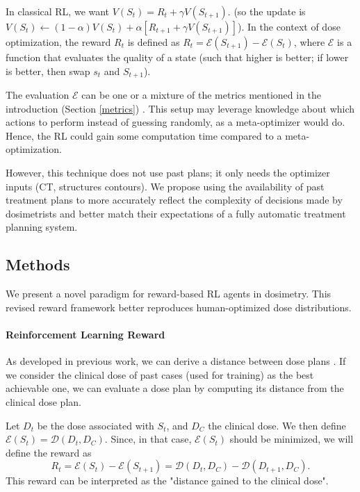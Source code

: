 In classical RL, we want $V(S_t) = R_t + \gamma V(S_{t+1})$.
(so the update is $V(S_t) \leftarrow (1-\alpha) V(S_t) + \alpha \left[ R_{t+1} + \gamma V(S_{t+1}) \right]$).
In the context of dose optimization, the reward $R_t$ is defined as $R_t = \mathcal{E}(S_{t+1}) - \mathcal{E}(S_t)$, where $\mathcal{E}$ is a function that evaluates the quality of a state (such that higher is better; if lower is better, then swap $s_t$ and $S_{t+1}$).

The evaluation $\mathcal{E}$ can be one or a mixture of the metrics mentioned in the introduction (Section \ref{metrics}) \cite{shen_hierarchical_2021} \cite{shen_intelligent_2019} \cite{moreau_reinforcement_2021}.
This setup may leverage knowledge about which actions to perform instead of guessing randomly, as a meta-optimizer would do.
Hence, the RL could gain some computation time compared to a meta-optimization.

However, this technique does not use past plans; it only needs the optimizer inputs (CT, structures contours).
We propose using the availability of past treatment plans to more accurately reflect the complexity of decisions made by dosimetrists and better match their expectations of a fully automatic treatment planning system.

\subsection{Methods}
We present a novel paradigm for reward-based RL agents in dosimetry.
This revised reward framework better reproduces human-optimized dose distributions.

\label{reinforcement_learning_framework}
\paragraph{Reinforcement Learning Reward}
As developed in previous work, we can derive a distance between dose plans \cite{paul_dubois_novel_2024}.
If we consider the clinical dose of past cases (used for training) as the best achievable one, we can evaluate a dose plan by computing its distance from the clinical dose plan.

Let $D_t$ be the dose associated with $S_t$, and $D_C$ the clinical dose.
We then define $\mathcal{E}(S_t) = \mathcal{D}(D_t, D_C)$.
Since, in that case, $\mathcal{E}(S_t)$ should be minimized, we will define the reward as $$R_t = \mathcal{E}(S_t) - \mathcal{E}(S_{t+1}) = \mathcal{D}(D_t, D_C) - \mathcal{D}(D_{t+1}, D_C).$$
This reward can be interpreted as the "distance gained to the clinical dose". 

